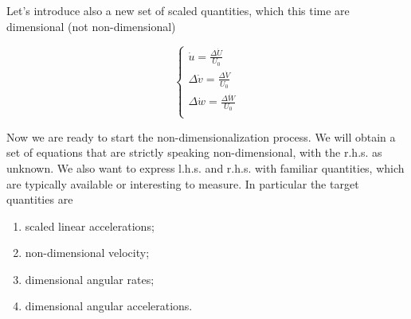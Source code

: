 Let's introduce also a new set  of scaled quantities, which this time are dimensional (not non-dimensional)

\begin{equation}
    \begin{cases}
               \dot u = \frac{\Delta \dot U}{U_0}\\
        \Delta \dot v = \frac{\Delta \dot V}{U_0}\\
        \Delta \dot w = \frac{\Delta \dot W}{U_0}\\
    \end{cases} 
\end{equation}

Now we are ready to start the non-dimensionalization process. We will obtain a set of equations that are strictly speaking non-dimensional, with the r.h.s. as unknown. We also want to express l.h.s. and r.h.s. with familiar quantities, which are typically available or interesting to measure. In particular the target quantities are
\begin{enumerate}
    \item scaled linear accelerations;
    \item non-dimensional velocity;
    \item dimensional angular rates;
    \item dimensional angular accelerations.
\end{enumerate}
